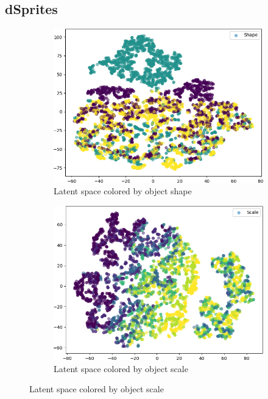 \documentclass[11pt,a4paper]{article}
\begin{document}
\subsection{dSprites}
\begin{figure}[H]
\centering
\begin{subfigure}{.19\textwidth}
\includegraphics[width=\textwidth]{images/latent_spaces/dsprites/vae_gan/embeddings_mu_0.png}
\caption{Latent space colored by object shape}
\end{subfigure}
\hfill
\begin{subfigure}{.19\textwidth}
\includegraphics[width=\textwidth]{images/latent_spaces/dsprites/vae_gan/embeddings_mu_1.png}
\caption{Latent space colored by object scale}
\label{subfig:vae_embedding_dsprites_scale}

\end{subfigure}
\end{figure}
\end{document}

